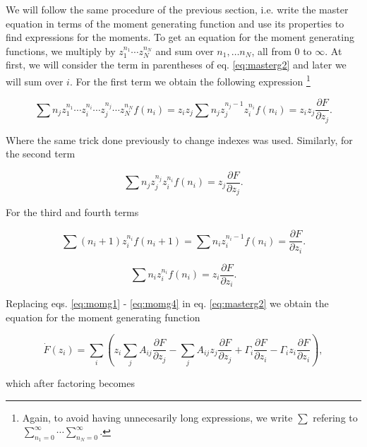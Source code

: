 We will follow the same procedure of the previous section, i.e. write the master equation in terms of the moment generating function and use its properties to find expressions for the moments. To get an equation for the moment generating functions, we multiply by $z_1^{n_1}\dotsm z_N^{n_N}$ and sum over $n_1,\dotsc n_N$, all from $0$ to $\infty$. At first, we will consider the term in parentheses of eq. \eqref{eq:masterg2} and later we will sum over $i$. For the first term we obtain the following expression \footnote{Again, to avoid having unnecesarily long expressions, we write $\sum$ refering to $\sum_{n_1=0}^\infty\dotsi\sum_{n_N=0}^\infty$.}

\begin{equation}
  \label{eq:momg1}
  \sum n_j z_1^{n_1}\dotsm z_i^{n_i}\dotsm z_j^{n_j}\dotsm z_N^{n_N} f(n_i) = z_iz_j\sum n_jz_j^{n_j-1}z_i^{n_i}f(n_i) = z_iz_j\frac{\partial F}{\partial z_j}. 
\end{equation} 

Where the same trick done previously to change indexes was used. Similarly, for the second term

\begin{equation}
  \label{eq:momg2}
  \sum n_jz_j^{n_j}z_i^{n_i}f(n_i) = z_j\frac{\partial F}{\partial z_j}.
\end{equation}

For the third and fourth terms

\begin{equation}
  \label{eq:momg3}
  \sum (n_i+1)z_i^{n_i}f(n_i+1) = \sum n_i z_i^{n_i-1}f(n_i) = \frac{\partial F}{\partial z_i}.
\end{equation}

\begin{equation}
  \label{eq:momg4}
  \sum n_iz_i^{n_i}f(n_i) = z_i\frac{\partial F}{\partial z_i}.
\end{equation}

Replacing eqs. \eqref{eq:momg1} - \eqref{eq:momg4} in eq. \eqref{eq:masterg2} we obtain the equation for the moment generating function

\begin{equation}
\dot{F}(z_i) = \sum_i\left( z_i\sum_jA_{ij}\frac{\partial F}{\partial z_j} - \sum_jA_{ij} z_j \frac{\partial F}{\partial z_j} + \Gamma_i\frac{\partial F}{\partial z_i} - \Gamma_iz_i\frac{\partial F}{\partial z_i}\right),
\end{equation}

which after factoring becomes

